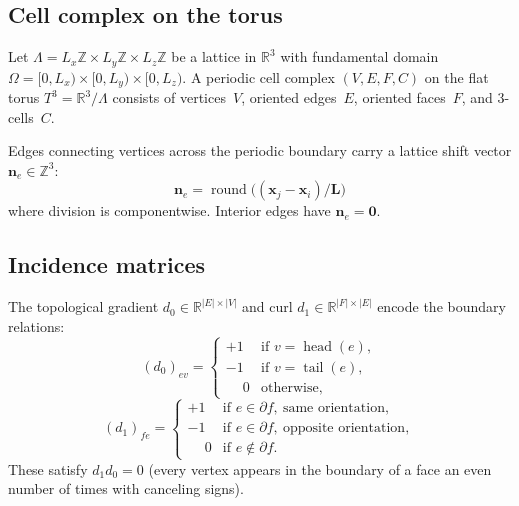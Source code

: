 \documentclass[preprint,12pt]{elsarticle}
\begin{document}
\subsection{Cell complex on the torus}

Let $\Lambda = L_x\mathbb{Z} \times L_y\mathbb{Z} \times L_z\mathbb{Z}$ be a lattice in $\mathbb{R}^3$ with fundamental domain $\Omega = [0,L_x) \times [0,L_y) \times [0,L_z)$. A periodic cell complex $(V, E, F, C)$ on the flat torus $T^3 = \mathbb{R}^3/\Lambda$ consists of vertices~$V$, oriented edges~$E$, oriented faces~$F$, and 3-cells~$C$.

Edges connecting vertices across the periodic boundary carry a lattice shift vector $\mathbf{n}_e \in \mathbb{Z}^3$:
\begin{equation}\label{eq:shift}
  \mathbf{n}_e = \operatorname{round}\!\bigl((\mathbf{x}_j - \mathbf{x}_i) / \mathbf{L}\bigr)
\end{equation}
where division is componentwise. Interior edges have $\mathbf{n}_e = \mathbf{0}$.

\subsection{Incidence matrices}

The topological gradient $d_0 \in \mathbb{R}^{|E|\times|V|}$ and curl $d_1 \in \mathbb{R}^{|F|\times|E|}$ encode the boundary relations:
\begin{equation}\label{eq:d0}
  (d_0)_{ev} = \begin{cases}
    +1 & \text{if } v = \operatorname{head}(e), \\
    -1 & \text{if } v = \operatorname{tail}(e), \\
    \phantom{+}0  & \text{otherwise},
  \end{cases}
\end{equation}
\begin{equation}\label{eq:d1}
  (d_1)_{fe} = \begin{cases}
    +1 & \text{if } e \in \partial f,\ \text{same orientation}, \\
    -1 & \text{if } e \in \partial f,\ \text{opposite orientation}, \\
    \phantom{+}0  & \text{if } e \notin \partial f.
  \end{cases}
\end{equation}
These satisfy $d_1 d_0 = 0$ (every vertex appears in the boundary of a face an even number of times with canceling signs).
\end{document}
